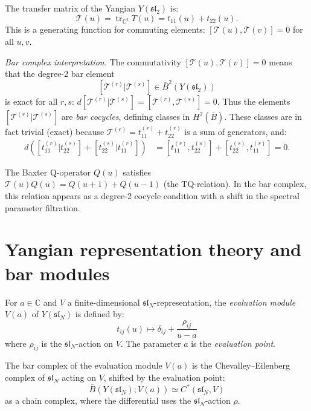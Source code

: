 \begin{computation}
\label{comp:transfer-matrix-bar}

The transfer matrix of the Yangian $Y(\mathfrak{sl}_2)$ is:
\[
\mathcal{T}(u) = \operatorname{tr}_{\mathbb{C}^2} T(u)
= t_{11}(u) + t_{22}(u).
\]
This is a generating function for commuting elements:
$[\mathcal{T}(u), \mathcal{T}(v)] = 0$ for all $u, v$.

\emph{Bar complex interpretation.}
The commutativity $[\mathcal{T}(u), \mathcal{T}(v)] = 0$ means that
the degree-2 bar element
\[
[\mathcal{T}^{(r)} | \mathcal{T}^{(s)}] \in \bar{B}^2(Y(\mathfrak{sl}_2))
\]
is exact for all $r, s$:
$d[\mathcal{T}^{(r)} | \mathcal{T}^{(s)}] = [\mathcal{T}^{(r)},
\mathcal{T}^{(s)}] = 0$.
Thus the elements $[\mathcal{T}^{(r)} | \mathcal{T}^{(s)}]$
are \emph{bar cocycles}, defining classes in $H^2(\bar{B})$.
These classes are in fact trivial (exact) because
$\mathcal{T}^{(r)} = t_{11}^{(r)} + t_{22}^{(r)}$ is a sum
of generators, and:
\begin{align*}
d([t_{11}^{(r)} | t_{22}^{(s)}] + [t_{22}^{(s)} | t_{11}^{(r)}])
&= [t_{11}^{(r)}, t_{22}^{(s)}] + [t_{22}^{(s)}, t_{11}^{(r)}] = 0.
\end{align*}

The Baxter Q-operator $Q(u)$ satisfies
$\mathcal{T}(u) Q(u) = Q(u+1) + Q(u-1)$
(the TQ-relation).  In the bar complex, this relation
appears as a degree-2 cocycle condition with a shift
in the spectral parameter filtration.
\end{computation}


\section{Yangian representation theory and bar modules}
\label{sec:yangian-rep-bar}

\begin{definition}\label{def:evaluation-module}
For $a \in \mathbb{C}$ and $V$ a finite-dimensional
$\mathfrak{sl}_N$-representation, the \emph{evaluation module}
$V(a)$ of $Y(\mathfrak{sl}_N)$ is defined by:
\[
t_{ij}(u) \mapsto \delta_{ij} + \frac{\rho_{ij}}{u - a}
\]
where $\rho_{ij}$ is the $\mathfrak{sl}_N$-action on $V$.
The parameter $a$ is the \emph{evaluation point}.
\end{definition}

\begin{proposition}
\label{prop:eval-module-bar}

The bar complex of the evaluation module $V(a)$ is the
Chevalley--Eilenberg complex of $\mathfrak{sl}_N$ acting on $V$,
shifted by the evaluation point:
\[
\bar{B}(Y(\mathfrak{sl}_N); V(a))
\simeq C^*(\mathfrak{sl}_N, V)
\]
as a chain complex, where the differential uses the
$\mathfrak{sl}_N$-action $\rho$.
\end{proposition}

